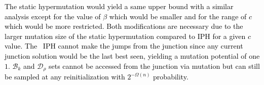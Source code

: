 \textcolor{black}{The static hypermutation would yield a same upper bound with a similar analysis except for the value of $\beta$ which would be smaller and for the range of $c$ which would be more restricted. Both modifications are necessary due to the larger mutation size of the static hypermutation compared to IPH for a given $c$ value. The \lastBest~IPH cannot make the jumps from the junction since any current junction solution would be the last best seen, yielding a mutation potential of one $1$. $\mathcal{B}_k$ and $\mathcal{D}_\rho$ sets cannot be accessed from the junction via mutation but can still be sampled at any reinitialization with $2^{-\Omega(n)}$ probability.}
